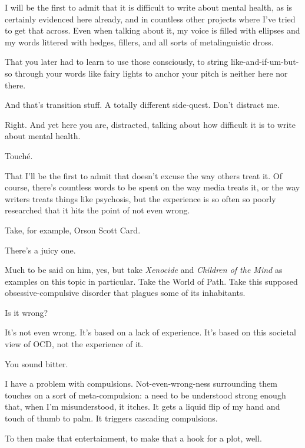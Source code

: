 \noindent I will be the first to admit that it is difficult to write about mental health, as is certainly evidenced here already, and in countless other projects where I've tried to get that across. Even when talking about it, my voice is filled with ellipses and my words littered with hedges, fillers, and all sorts of metalinguistic dross.

\begin{ally}
That you later had to learn to use those consciously, to string like-and-if-um-but-so through your words like fairy lights to anchor your pitch is neither here nor there.
\end{ally}
And that's transition stuff. A totally different side-quest. Don't distract me.

\begin{ally}
Right. And yet here you are, distracted, talking about how difficult it is to write about mental health.
\end{ally}
Touché.

That I'll be the first to admit that doesn't excuse the way others treat it. Of course, there's countless words to be spent on the way media treats it, or the way writers treats things like psychosis, but the experience is so often so poorly researched that it hits the point of not even wrong.

Take, for example, Orson Scott Card.

\begin{ally}
There's a juicy one.
\end{ally}
Much to be said on him, yes, but take \emph{Xenocide} and \emph{Children of the Mind} as examples on this topic in particular. Take the World of Path. Take this supposed obsessive-compulsive disorder that plagues some of its inhabitants.

\begin{ally}
Is it wrong?
\end{ally}
It's not even wrong. It's based on a lack of experience. It's based on this societal view of OCD, not the experience of it.

\begin{ally}
You sound bitter.
\end{ally}
I have a problem with compulsions. Not-even-wrong-ness surrounding them touches on a sort of meta-compulsion: a need to be understood strong enough that, when I'm misunderstood, it itches. It gets a liquid flip of my hand and touch of thumb to palm. It triggers cascading compulsions.

To then make that entertainment, to make that a hook for a plot, well.

